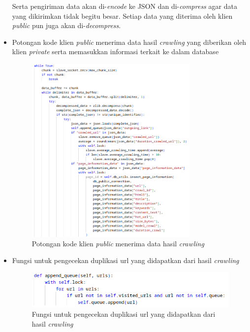 \begin{itemize}
	Serta pengiriman data akan di-\emph{encode} ke JSON dan di-\emph{compress} agar data yang dikirimkan tidak begitu besar. Setiap data yang diterima oleh klien \emph{public} pun juga akan di-\emph{decompress}. 

	\item{Potongan kode klien \emph{public} menerima data hasil \emph{crawling} yang diberikan oleh klien \emph{private} serta memasukkan informasi terkait ke dalam database}
	\begin{figure}[H]
		\centering{}
		\includegraphics[width=0.8\textwidth]{gambar/kode/potongan_client_05}
		\caption{Potongan kode klien \emph{public} menerima data hasil \emph{crawling}}
	\end{figure}

	\item{Fungsi untuk pengecekan duplikasi url yang didapatkan dari hasil \emph{crawling}}
	\begin{figure}[H]
		\centering{}
		\includegraphics[width=1\textwidth]{gambar/kode/potongan_client_06}
		\caption{Fungsi untuk pengecekan duplikasi url yang didapatkan dari hasil \emph{crawling}}
	\end{figure}


\end{itemize}
